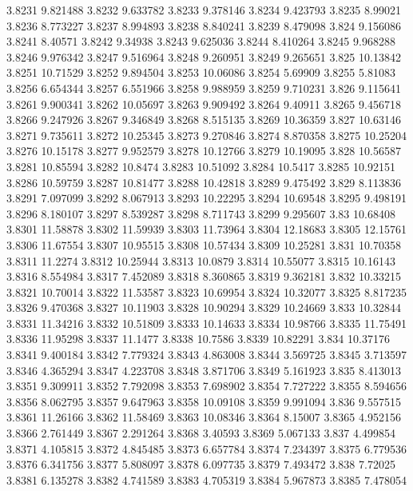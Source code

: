 3.8231  9.821488
3.8232  9.633782
3.8233  9.378146
3.8234  9.423793
3.8235  8.99021
3.8236  8.773227
3.8237  8.994893
3.8238  8.840241
3.8239  8.479098
3.824  9.156086
3.8241  8.40571
3.8242  9.34938
3.8243  9.625036
3.8244  8.410264
3.8245  9.968288
3.8246  9.976342
3.8247  9.516964
3.8248  9.260951
3.8249  9.265651
3.825  10.13842
3.8251  10.71529
3.8252  9.894504
3.8253  10.06086
3.8254  5.69909
3.8255  5.81083
3.8256  6.654344
3.8257  6.551966
3.8258  9.988959
3.8259  9.710231
3.826  9.115641
3.8261  9.900341
3.8262  10.05697
3.8263  9.909492
3.8264  9.40911
3.8265  9.456718
3.8266  9.247926
3.8267  9.346849
3.8268  8.515135
3.8269  10.36359
3.827  10.63146
3.8271  9.735611
3.8272  10.25345
3.8273  9.270846
3.8274  8.870358
3.8275  10.25204
3.8276  10.15178
3.8277  9.952579
3.8278  10.12766
3.8279  10.19095
3.828  10.56587
3.8281  10.85594
3.8282  10.8474
3.8283  10.51092
3.8284  10.5417
3.8285  10.92151
3.8286  10.59759
3.8287  10.81477
3.8288  10.42818
3.8289  9.475492
3.829  8.113836
3.8291  7.097099
3.8292  8.067913
3.8293  10.22295
3.8294  10.69548
3.8295  9.498191
3.8296  8.180107
3.8297  8.539287
3.8298  8.711743
3.8299  9.295607
3.83  10.68408
3.8301  11.58878
3.8302  11.59939
3.8303  11.73964
3.8304  12.18683
3.8305  12.15761
3.8306  11.67554
3.8307  10.95515
3.8308  10.57434
3.8309  10.25281
3.831  10.70358
3.8311  11.2274
3.8312  10.25944
3.8313  10.0879
3.8314  10.55077
3.8315  10.16143
3.8316  8.554984
3.8317  7.452089
3.8318  8.360865
3.8319  9.362181
3.832  10.33215
3.8321  10.70014
3.8322  11.53587
3.8323  10.69954
3.8324  10.32077
3.8325  8.817235
3.8326  9.470368
3.8327  10.11903
3.8328  10.90294
3.8329  10.24669
3.833  10.32844
3.8331  11.34216
3.8332  10.51809
3.8333  10.14633
3.8334  10.98766
3.8335  11.75491
3.8336  11.95298
3.8337  11.1477
3.8338  10.7586
3.8339  10.82291
3.834  10.37176
3.8341  9.400184
3.8342  7.779324
3.8343  4.863008
3.8344  3.569725
3.8345  3.713597
3.8346  4.365294
3.8347  4.223708
3.8348  3.871706
3.8349  5.161923
3.835  8.413013
3.8351  9.309911
3.8352  7.792098
3.8353  7.698902
3.8354  7.727222
3.8355  8.594656
3.8356  8.062795
3.8357  9.647963
3.8358  10.09108
3.8359  9.991094
3.836  9.557515
3.8361  11.26166
3.8362  11.58469
3.8363  10.08346
3.8364  8.15007
3.8365  4.952156
3.8366  2.761449
3.8367  2.291264
3.8368  3.40593
3.8369  5.067133
3.837  4.499854
3.8371  4.105815
3.8372  4.845485
3.8373  6.657784
3.8374  7.234397
3.8375  6.779536
3.8376  6.341756
3.8377  5.808097
3.8378  6.097735
3.8379  7.493472
3.838  7.72025
3.8381  6.135278
3.8382  4.741589
3.8383  4.705319
3.8384  5.967873
3.8385  7.478054
